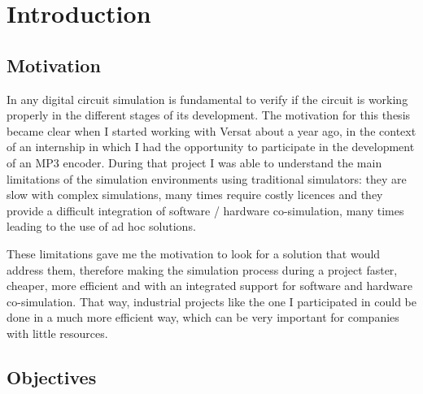 
\chapter{Introduction}
\label{chapter:introduction}


\section{Motivation}
\label{section:motivation}

In any digital circuit simulation is fundamental to verify if the circuit is
working properly in the different stages of its development. The motivation for
this thesis became clear when I started working with Versat about a year ago, in
the context of an internship in which I had the opportunity to participate in
the development of an MP3 encoder. During that project I was able to understand
the main limitations of the simulation environments using traditional
simulators: they are slow with complex simulations, many times require costly
licences and they provide a difficult integration of software / hardware
co-simulation, many times leading to the use of ad hoc solutions.

These limitations gave me the motivation to look for a solution that would
address them, therefore making the simulation process during a project faster,
cheaper, more efficient and with an integrated support for software and hardware
co-simulation. That way, industrial projects like the one I participated in
could be done in a much more efficient way, which can be very important for
companies with little resources.

\section{Objectives}
\label{section:objectives}

